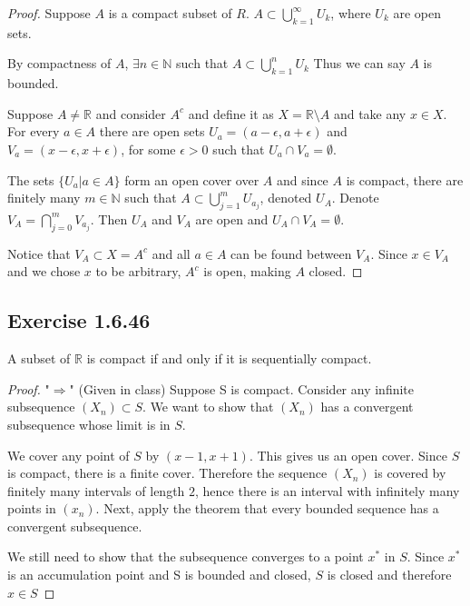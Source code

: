 \documentclass{tufte-book}
\theoremstyle{mytheoremstyle}
\theoremstyle{mylemstyle}
\theoremstyle{mydefstyle}
\begin{document}
\begin{proof}
Suppose $A$ is a compact subset of $R$.  $A \subset \bigcup\limits_{k=1}^{\infty}U_k$, where $U_k$ are open sets.

By compactness of $A$, $\exists n \in \mathbb{N}$ such that $A \subset \bigcup\limits_{k=1}^{n}U_k$ Thus we can say $A$ is bounded.

Suppose $A \neq \mathbb{R}$ and consider $A^c$ and define it as $X = \mathbb{R} \setminus A$ and take any $x \in X$. For every $a \in A$ there are open sets $U_a = (a-\epsilon,a+\epsilon)$ and $V_a = (x-\epsilon, x+\epsilon)$, for some $\epsilon > 0$ such that $U_a \cap V_a = \emptyset$.

The sets $\{U_a | a \in A\}$ form an open cover over $A$ and since $A$ is compact, there are finitely many $m \in \mathbb{N}$ such that $A \subset \bigcup\limits_{j=1}^{m}U_{a_{j}}$, denoted $U_A$.  Denote $V_A=\bigcap\limits_{j=0}^{m}V_{a_{j}}$.  Then $U_A$ and $V_A$ are open and $U_A \cap V_A = \emptyset$.

Notice that $V_A \subset X = A^c$ and all $a \in A$ can be found between $V_A$. Since $x \in V_A$ and we chose $x$ to be arbitrary,  $A^c$ is open, making $A$ closed.

\end{proof}

\subsection{Exercise 1.6.46}

A subset of $\mathbb{R}$ is compact if and only if it is sequentially compact.

\begin{proof}"$\Rightarrow$" (Given in class)
Suppose S is compact. Consider any infinite subsequence $(X_n) \subset S$.  We want to show that $(X_n)$ has a convergent subsequence whose limit is in $S$.

We cover any point of $S$ by $(x-1, x+1)$.  This gives us an open cover.  Since $S$ is compact, there is a finite cover.  Therefore the sequence $(X_n)$ is covered by finitely many intervals of length $2$, hence there is an interval with infinitely many points in $(x_n)$.  Next, apply the theorem that every bounded sequence has a convergent subsequence.  

We still need to show that the subsequence converges to a point $x^*$ in $S$. Since $x^*$ is an accumulation point and S is bounded and closed, $S$ is closed and therefore $x \in S$

\end{proof}
\end{document}
